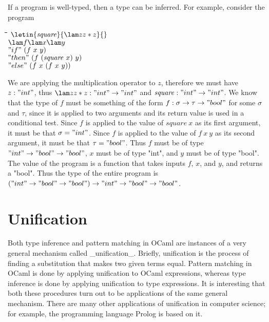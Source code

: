 If a program is well-typed, then a type can be inferred. For example, consider the program
\begin{tabbing}
\hspace{1em}\=\hspace{1em}\=\hspace{1em}\=\hspace{1em}\=\hspace{1em}\=\hspace{1em}\=\kill
$\letin{\mathit{square}}{\lam z{z*z}}{}$\\
\>$\lam f{\lam x{\lam y{}}}$\\
\>\>$"if"~(f~x~y)$\\
\>\>\>$"then"~(f~(\mathit{square}~x)~y)$\\
\>\>\>$"else"~(f~x~(f~x~y))$
\end{tabbing}
We are applying the multiplication operator to $z$, therefore we must have $z:"int"$, thus $\lam z{z*z}:"int"\to"int"$ and $\mathit{square}:"int"\to"int"$. We know that the type of $f$ must be something of the form $f:\sigma\to\tau\to"bool"$ for some $\sigma$ and $\tau$, since it is applied to two arguments and its return value is used in a conditional test. Since $f$ is applied to the value of $\mathit{square}~x$ as its first argument, it must be that $\sigma="int"$. 
Since $f$ is applied to the value of $f~x~y$ as its second argument, it must be that $\tau="bool"$.
Thus $f$ must be of type $"int"\to"bool"\to"bool"$, $x$ must be of type "int", and $y$ must be of type "bool". The value of the program is a function that takes inputs $f$, $x$, and $y$, and returns a "bool". Thus the type of the entire program is $("int"\to"bool"\to"bool")\to"int"\to"bool"\to"bool"$.

\section{Unification}

Both type inference and pattern matching in OCaml are instances of a very general mechanism called _unification_. Briefly, unification is the process of finding a substitution that makes two given terms equal. Pattern matching in OCaml is done by applying unification to OCaml expressions, whereas type inference is done by applying unification to type expressions. It is interesting that both these procedures turn out to be applications of the same general mechanism. There are many other applications of unification in computer science; for example, the programming language Prolog is based on it.

